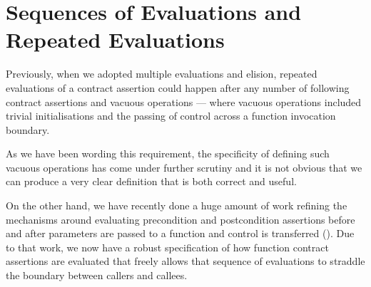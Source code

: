 \section{Sequences of Evaluations and Repeated Evaluations}

Previously, when we adopted multiple evaluations and elision,
repeated evaluations of a contract assertion could happen
after any number of following contract assertions
and vacuous operations --- where vacuous operations included
trivial initialisations and the passing of control
across a function invocation boundary.

As we have been wording this requirement, the specificity
of defining such vacuous operations has come under further
scrutiny and it is not obvious that we can produce a very
clear definition that is both correct and useful.

On the other hand, we have recently done a huge amount of
work refining the mechanisms around evaluating precondition
and postcondition assertions before and after parameters
are passed to a function and control is transferred (\cite{P3487R0}).
Due to that work, we now have a robust specification of how
function contract assertions are evaluated that freely
allows that sequence of evaluations to straddle the boundary
between callers and callees.

